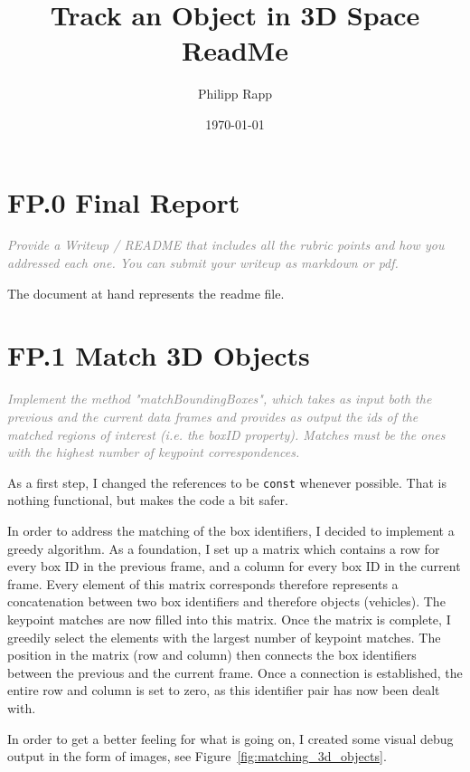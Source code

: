 \documentclass[a4paper]{scrartcl}
\title{Track an Object in 3D Space ReadMe}
\author{Philipp Rapp}
\date{\today}
\begin{document}
\maketitle

\section*{FP.0 Final Report}
\textcolor{gray}{\textit{Provide a Writeup / README that includes all the rubric points and how you addressed each one. You can submit your writeup as markdown or pdf.}}

The document at hand represents the readme file.

\section*{FP.1 Match 3D Objects}
\textcolor{gray}{\textit{Implement the method "matchBoundingBoxes", which takes as input both the previous and the current data frames and provides as output the ids of the matched regions of interest (i.e. the boxID property). Matches must be the ones with the highest number of keypoint correspondences.}}

As a first step, I changed the references to be \texttt{const} whenever possible.
That is nothing functional, but makes the code a bit safer.

In order to address the matching of the box identifiers, I decided to implement a greedy algorithm.
As a foundation, I set up a matrix which contains a row for every box ID in the previous frame,
and a column for every box ID in the current frame.
Every element of this matrix corresponds therefore represents a concatenation between two box identifiers
and therefore objects (vehicles).
The keypoint matches are now filled into this matrix.
Once the matrix is complete, I greedily select the elements with the largest number of keypoint matches.
The position in the matrix (row and column) then connects the box identifiers between the previous
and the current frame. Once a connection is established, the entire row and column is set to zero,
as this identifier pair has now been dealt with.

In order to get a better feeling for what is going on, I created some visual debug output in the
form of images, see Figure~\ref{fig:matching_3d_objects}.
\end{document}
